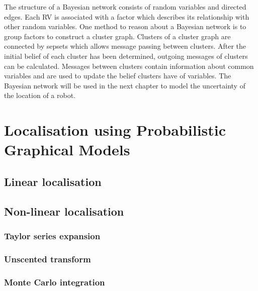 \documentclass[12pt,oneside,openany,a4paper, %
afrikaans,english,
]{memoir}
\numberwithin{equation}{chapter}
\begin{document}
The structure of a Bayesian network consists of random variables and directed edges. Each RV is associated with a factor which describes its relationship with other random variables. One method to reason about a Bayesian network is to group factors to construct a cluster graph. Clusters of a cluster graph are connected by sepsets which allows message passing between clusters. After the initial belief of each cluster has been determined, outgoing messages of clusters can be calculated. Messages between clusters contain information about common variables and are used to update the belief clusters have of variables. The Bayesian network will be used in the next chapter to model the uncertainty of the location of a robot.
\chapter{Localisation using Probabilistic Graphical Models}
\section{Linear localisation}
\section{Non-linear localisation}
\subsection{Taylor series expansion}
\subsection{Unscented transform}
\subsection{Monte Carlo integration}

\backmatter
{}
\end{document}
